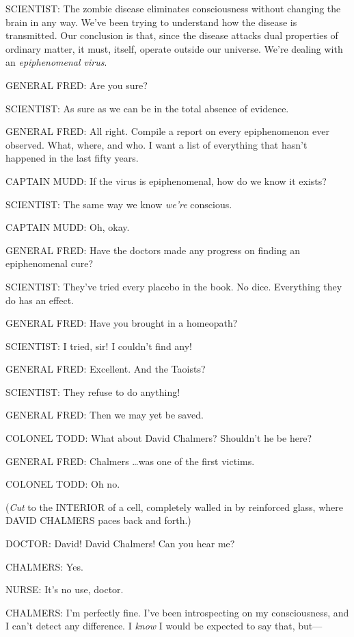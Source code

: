 {
 SCIENTIST: The zombie disease eliminates consciousness without
changing the brain in any way. We've been trying to
understand how the disease is transmitted. Our conclusion is that,
since the disease attacks dual properties of ordinary matter, it must,
itself, operate outside our universe. We're dealing
with an \textit{epiphenomenal virus}.}

{
 GENERAL FRED: Are you sure?}

{
 SCIENTIST: As sure as we can be in the total absence of evidence.}

{
 GENERAL FRED: All right. Compile a report on every epiphenomenon
ever observed. What, where, and who. I want a list of everything that
hasn't happened in the last fifty years.}

{
 CAPTAIN MUDD: If the virus is epiphenomenal, how do we know it
exists?}

{
 SCIENTIST: The same way we know \textit{we're}
conscious.}

{
 CAPTAIN MUDD: Oh, okay.}

{
 GENERAL FRED: Have the doctors made any progress on finding an
epiphenomenal cure?}

{
 SCIENTIST: They've tried every placebo in the
book. No dice. Everything they do has an effect.}

{
 GENERAL FRED: Have you brought in a homeopath?}

{
 SCIENTIST: I tried, sir! I couldn't find any!}

{
 GENERAL FRED: Excellent. And the Taoists?}

{
 SCIENTIST: They refuse to do anything!}

{
 GENERAL FRED: Then we may yet be saved.}

{
 COLONEL TODD: What about David Chalmers? Shouldn't
he be here?}

{
 GENERAL FRED: Chalmers \ldots was one of the first victims.}

{
 COLONEL TODD: Oh no.}

{
 (\textit{Cut} to the INTERIOR of a cell, completely walled in by
reinforced glass, where DAVID CHALMERS paces back and forth.)}

{
 DOCTOR: David! David Chalmers! Can you hear me?}

{
 CHALMERS: Yes.}

{
 NURSE: It's no use, doctor.}

{
 CHALMERS: I'm perfectly fine. I've
been introspecting on my consciousness, and I can't
detect any difference. I \textit{know} I would be expected to say that,
but---}

